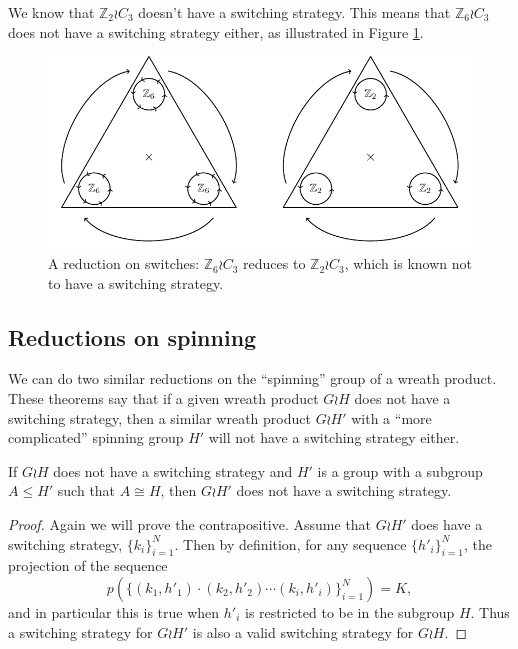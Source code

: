 \begin{example}
  We know that $\mathbb Z_2 \wr C_3$ doesn't have a switching strategy.
  This means that $\mathbb Z_6 \wr C_3$ does not have a switching strategy either,
  as illustrated in Figure \ref{fig:Z2C3}.
  \begin{figure}
    \center
    \includegraphics{assets/tikz_Z2C3.pdf}
    \caption[A reduction from a six-way switch to a two-way switch]{
      A reduction on switches:
      $\mathbb Z_6 \wr C_3$ reduces to $\mathbb Z_2 \wr C_3$,
      which is known not to have a switching strategy.
    }
    \label{fig:Z2C3}
  \end{figure}
\end{example}
\subsection{Reductions on spinning}
We can do two similar reductions on the ``spinning'' group of a wreath product.
These theorems say that if a given wreath product $G \wr H$ does not have a
switching strategy, then a similar wreath product $G \wr H'$ with a
``more complicated'' spinning group $H'$ will not have a switching strategy
either.
\begin{theorem}
  If $G \wr H$ does not have a switching strategy and $H'$ is a group with
  a subgroup $A \leq H'$ such that $A \cong H$, then
  $G \wr H'$ does not have a switching strategy.
  \label{thm:SpinReduction}
\end{theorem}
\begin{proof}
  Again we will prove the contrapositive.
  Assume that $G \wr H'$ does have a switching strategy,
  $\{k_i\}_{i=1}^N$. Then by definition, for any sequence
  $\{h'_i\}_{i=1}^N$, the projection of the sequence \begin{equation}
    p(\{(k_1, h'_1)\cdot(k_2, h'_2)\cdots(k_i, h'_i)\}_{i=1}^N) = K,
  \end{equation} and in particular this is true when $h'_i$ is restricted to be in the
  subgroup $H$. Thus a switching strategy for $G \wr H'$ is also a valid
  switching strategy for $G \wr H$.
\end{proof}

